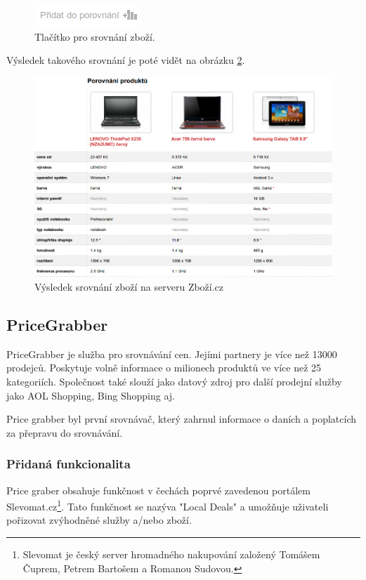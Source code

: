 \begin{figure}[htb]
\begin{center}
\includegraphics[width=40mm]{./pictures/zbozicz-srovnat.png}
\caption{Tlačítko pro srovnání zboží.}
\label{fig:zbozicz-srovnat}
\end{center}
\end{figure}

Výsledek takového srovnání je poté vidět na obrázku \ref{fig:zbozicz-srovnani}.

\begin{figure}[htb]
\begin{center}
\includegraphics[width=130mm]{./pictures/zbozicz-srovnani.png}
\caption{Výsledek srovnání zboží na serveru Zboží.cz}
\label{fig:zbozicz-srovnani}
\end{center}
\end{figure}

\subsection{PriceGrabber}
PriceGrabber je služba pro srovnávání cen. Jejími partnery je více než 13000 prodejců. Poskytuje volně informace o milionech produktů ve více než 25 kategoriích. Společnost také slouží jako datový zdroj pro další prodejní služby jako AOL Shopping, Bing Shopping aj. \cite{website:wiki:pricegrabber}

Price grabber byl první srovnávač, který zahrnul informace o daních a poplatcích za přepravu do srovnávání. \cite{website:wiki:pricegrabber}

\subsubsection{Přidaná funkcionalita}
Price graber obsahuje funkčnost v čechách poprvé zavedenou portálem Slevomat.cz\footnote{Slevomat je český server hromadného nakupování založený Tomášem Čuprem, Petrem Bartošem a Romanou Sudovou.}. Tato funkčnost se nazýva "Local Deals" a umožňuje uživateli pořizovat zvýhodněné služby a/nebo zboží.

